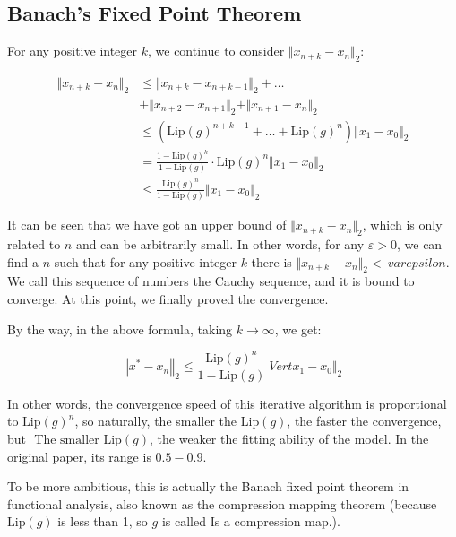 \documentclass[final]{cvpr}
\begin{document}
\begin {appendix}
\section{Banach's Fixed Point Theorem}
\label{app3}
For any positive integer $k$, we continue to consider $\Vert x_{n+k}-x_{n}\Vert_2$:

\begin{equation}\begin{aligned}\Vert x_{n+k}-x_{n}\Vert_2&\leq\Vert x_{n+k}-x_{n+k-1}\Vert_2+\dots\\&+\Vert x_{n+2}-x_{n+1}\Vert_2+\Vert x_{n+1}-x_{n}\Vert_2\\
&\leq \left(\text{Lip}(g)^{n+k-1}+\dots +\text{Lip}(g)^{ n}\right)\Vert x_{1}-x_{0}\Vert_2\\
& = \frac{1-\text{Lip}(g)^k}{1-\text{Lip}(g)}\cdot\text{Lip}(g)^{n}\Vert x_{1} -x_{0}\Vert_2\\
& \leq \frac{\text{Lip}(g)^n}{1-\text{Lip}(g)}\Vert x_{1}-x_{0}\Vert_2
\end{aligned}\end{equation}

It can be seen that we have got an upper bound of $\Vert x_{n+k}-x_{n}\Vert_2$, which is only related to $n$ and can be arbitrarily small. In other words, for any $\varepsilon> 0$, we can find a $n$ such that for any positive integer $k$ there is $\Vert x_{n+k}-x_{n}\Vert_2 <\ varepsilon$. We call this sequence of numbers the Cauchy sequence, and it is bound to converge. At this point, we finally proved the convergence.

By the way, in the above formula, taking $k\to\infty$, we get:

\begin{equation}\left\Vert x^*-x_{n}\right\Vert_2 \leq \frac{\text{Lip}(g)^n}{1-\text{Lip}(g)}\ Vert x_{1}-x_{0}\Vert_2\end{equation}

In other words, the convergence speed of this iterative algorithm is proportional to $\text{Lip}(g)^n$, so naturally, the smaller the $\text{Lip}(g)$, the faster the convergence, but $\text{ The smaller Lip}(g)$, the weaker the fitting ability of the model. In the original paper, its range is $0.5-0.9$.

To be more ambitious, this is actually the Banach fixed point theorem in functional analysis, also known as the compression mapping theorem (because $\text{Lip}(g)$ is less than 1, so $g$ is called Is a compression map.).

\end {appendix}
\end{document}
